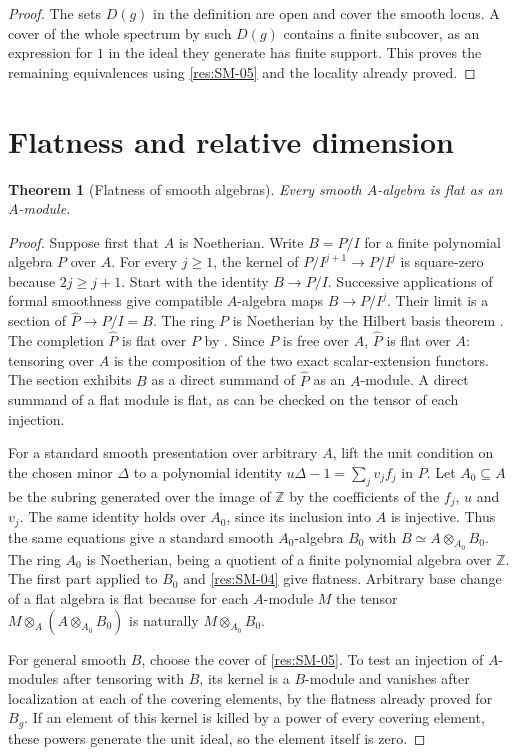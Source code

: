 \documentclass[11pt,oneside,openany]{book}
\newtheorem{theorem}{Theorem}[chapter]
\theoremstyle{definition}
\theoremstyle{remark}
\begin{document}
\begin{proof}
The sets $D(g)$ in the definition are open and cover the smooth
locus. A cover of the whole spectrum by such $D(g)$ contains a
finite subcover, as an expression for $1$ in the ideal they
generate has finite support. This proves the remaining equivalences
using \ref{res:SM-05} and the locality already proved.
\end{proof}

\section{Flatness and relative dimension}

\begin{theorem}[Flatness of smooth algebras]
\label{res:SM-08}
Every smooth $A$-algebra is flat as an $A$-module.
\end{theorem}

\begin{proof}
Suppose first that $A$ is Noetherian. Write $B=P/I$ for a finite
polynomial algebra $P$ over $A$. For every $j\ge 1$, the kernel
of $P/I^{j+1}\to P/I^j$ is square-zero because $2j\ge j+1$.
Start with the identity $B\to P/I$. Successive applications of
formal smoothness give compatible $A$-algebra maps
$B\to P/I^j$. Their limit is a section of
$\widehat P\to P/I=B$. The ring $P$ is Noetherian by the
Hilbert basis theorem \cite[Theorem ALG-05-C02-R01]{p103}.
The completion $\widehat P$ is flat over $P$ by
\cite[Theorem ALG-05-C04-S01]{p103}. Since $P$ is free over $A$,
$\widehat P$ is flat over $A$: tensoring over $A$ is the
composition of the two exact scalar-extension functors.
The section exhibits $B$ as a direct summand of $\widehat P$
as an $A$-module. A direct summand of a flat module is flat,
as can be checked on the tensor of each injection.

For a standard smooth presentation over arbitrary $A$, lift the
unit condition on the chosen minor $\Delta$ to a polynomial
identity $u\Delta-1=\sum_j v_j f_j$ in $P$.
Let $A_0\subseteq A$ be the subring generated over the image
of $\mathbb Z$ by the coefficients of the $f_j$, $u$ and $v_j$.
The same identity holds over $A_0$, since its inclusion into
$A$ is injective. Thus the same equations give a standard
smooth $A_0$-algebra $B_0$ with $B\simeq A\otimes_{A_0}B_0$.
The ring $A_0$ is Noetherian, being a quotient of a finite
polynomial algebra over $\mathbb Z$. The first part applied
to $B_0$ and \ref{res:SM-04} give flatness. Arbitrary base
change of a flat algebra is flat because for each $A$-module
$M$ the tensor $M\otimes_A(A\otimes_{A_0}B_0)$ is naturally
$M\otimes_{A_0}B_0$.

For general smooth $B$, choose the cover of \ref{res:SM-05}.
To test an injection of $A$-modules after tensoring with $B$,
its kernel is a $B$-module and vanishes after localization
at each of the covering elements, by the flatness already
proved for $B_g$. If an element of this kernel is killed by
a power of every covering element, these powers generate
the unit ideal, so the element itself is zero.
\end{proof}
\end{document}
